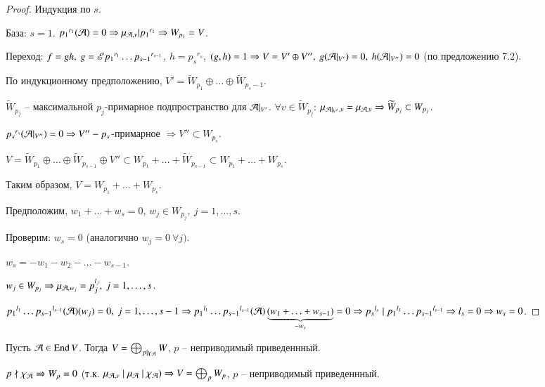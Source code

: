 \documentclass[main]{subfiles}
\begin{document}
\begin{proof}
    Индукция по $s$.

    База: $s = 1$. ${p_1}^{r_1}(\mathcal{A}) = 0 \Rightarrow \mu_{\mathcal{A}, v} | {p_1}^{r_1} \Rightarrow W_{p_1} = V$.

    Переход: $f = gh, \ g = \mathscr{E} {p_1}^{r_1} \ldots {p_{s-1}}^{r_{s-1}}$, $h = {p_s}^{r_s}$, $(g, h) = 1 \Rightarrow
        V = V' \oplus V'', \ g(\mathcal{A} |_{V'}) = 0, \ h(\mathcal{A} |_{V''}) = 0$ (по предложению 7.2).

    По индукционному предположению, $V' =  \widetilde{W}_{p_1} \oplus \ldots \oplus \widetilde{W}_{p_s-1}$.

    $\widetilde{W}_{p_j}$ -- максимальной $p_j$-примарное подпространство для $\mathcal{A} |_{V'}$.
    $\forall v \in \widetilde{W}_{p_j}$: $\mu_{\mathcal{A} |_{V'}, v} = \mu_{\mathcal{A}, v} \Rightarrow \widetilde{W}_{p_j} \subset W_{p_j}$.

    ${p_s}^{r_s}(\mathcal{A} |_{V''}) = 0 \Rightarrow V'' - p_s$-примарное $ \Rightarrow
        V'' \subset W_{p_s}$.

    $V = \widetilde{W}_{p_1} \oplus \ldots \oplus \widetilde{W}_{p_{s-1}} \oplus V'' \subset W_{p_1} + \ldots + \widetilde{W}_{p_{s-1}} \subset W_{p_1} + \ldots + W_{p_s}$.

    Таким образом, $V = W_{p_1} + \ldots + W_{p_s}$.

    Предположим, $w_1 + \ldots + w_s = 0$, $w_j \in W_{p_j}, \ j = 1, \ldots, s$.

    Проверим: $w_s = 0$ (аналогично $w_j = 0 \ \forall j)$.

    $w_s = - w_1 - w_2 - \ldots - w_{s-1}$.

    $w_j \in W_{p_j} \Rightarrow \mu_{\mathcal{A}, w_j} = p_j^{l_j}, \ j = 1, \ldots, s$.

    ${p_1}^{l_1} \ldots {p_{s-1}}^{l_{s-1}} (\mathcal{A}) (w_j) = 0, \ j = 1, \ldots, s-1 \Rightarrow
        {p_1}^{l_1} \ldots {p_{s-1}}^{l_{s-1}} (\mathcal{A}) \underbrace{(w_1 + \ldots + w_{s-1})}_{-w_s} = 0  \Rightarrow
        {p_s}^{l_s} \mid {p_1}^{l_1} \ldots {p_{s-1}}^{l_{s-1}} \Rightarrow l_s = 0 \Rightarrow w_s = 0$.
\end{proof}

\begin{corollary}
    Пусть $\mathcal{A} \in \operatorname{End} V$. Тогда $V = \bigoplus_{p|\chi_{\mathcal{A}}} W$, $p$ -- неприводимый приведеннный.
\end{corollary}

\begin{remark}
    $p \nmid \chi_{\mathcal{A}} \Rightarrow W_p = 0$ (т.к. $\mu_{\mathcal{A}, v} \mid \mu_{\mathcal{A}} \mid \chi_{\mathcal{A}}) \Rightarrow V = \bigoplus_p W_p$, $p$ -- неприводимый приведеннный.
\end{remark}
\end{document}
